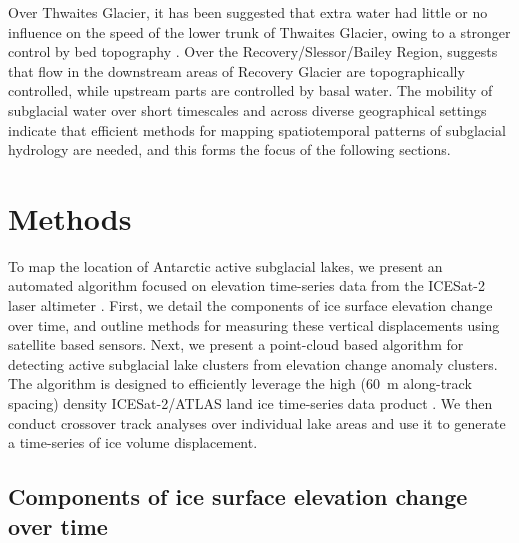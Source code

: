 Over Thwaites Glacier, it has been suggested that extra water had little or no influence on the speed of the lower trunk of Thwaites Glacier, owing to a stronger control by bed topography \citep{SmithConnectedsubglaciallake2017,HoffmanBriefCommunicationHeterogenous2020}.
Over the Recovery/Slessor/Bailey Region, \citet{DiezBasalSettingsControl2018} suggests that flow in the downstream areas of Recovery Glacier are topographically controlled, while upstream parts are controlled by basal water.
The mobility of subglacial water over short timescales and across diverse geographical settings indicate that efficient methods for mapping spatiotemporal patterns of subglacial hydrology are needed, and this forms the focus of the following sections.

\clearpage
\section{Methods}

To map the location of Antarctic active subglacial lakes, we present an automated algorithm focused on elevation time-series data from the ICESat-2 laser altimeter \citep{MarkusIceCloudland2017,NeumannIceCloudLand2019}.
First, we detail the components of ice surface elevation change over time, and outline methods for measuring these vertical displacements using satellite based sensors.
Next, we present a point-cloud based algorithm for detecting active subglacial lake clusters from elevation change anomaly clusters.
The algorithm is designed to efficiently leverage the high (\SI{60}{m} along-track spacing) density ICESat-2/ATLAS land ice time-series data product \citep[ATL11;][]{SmithATLASICESat2L3B2021}.
We then conduct crossover track analyses over individual lake areas and use it to generate a time-series of ice volume displacement.


\subsection{Components of ice surface elevation change over time} \label{sec:componentsofdhdt}

